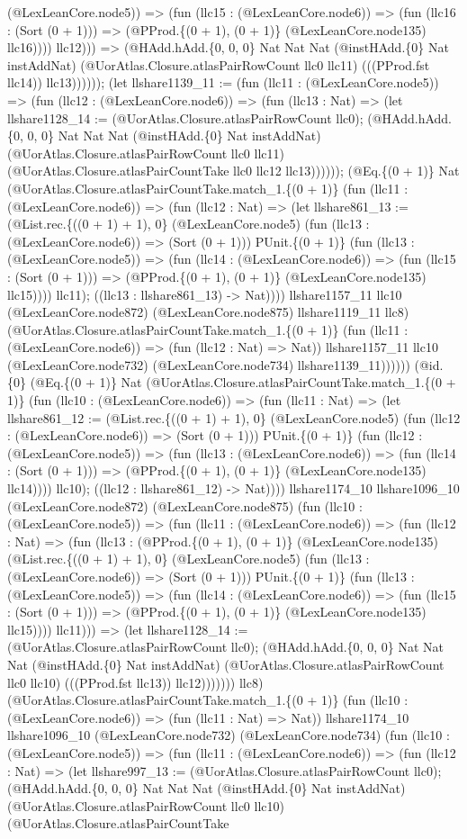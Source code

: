 \documentclass[11pt]{article}
\begin{document}
(@LexLeanCore.node5)) => (fun (llc15 : (@LexLeanCore.node6)) => (fun (llc16 : (Sort (0 + 1))) => (@PProd.\{(0 + 1), (0 + 1)\} (@LexLeanCore.node135) llc16)))) llc12))) => (@HAdd.hAdd.\{0, 0, 0\} Nat Nat Nat (@instHAdd.\{0\} Nat instAddNat) (@UorAtlas.Closure.atlasPairRowCount llc0 llc11) (((PProd.fst llc14)) llc13)))))); (let llshare1139\_11 := (fun (llc11 : (@LexLeanCore.node5)) => (fun (llc12 : (@LexLeanCore.node6)) => (fun (llc13 : Nat) => (let llshare1128\_14 := (@UorAtlas.Closure.atlasPairRowCount llc0); (@HAdd.hAdd.\{0, 0, 0\} Nat Nat Nat (@instHAdd.\{0\} Nat instAddNat) (@UorAtlas.Closure.atlasPairRowCount llc0 llc11) (@UorAtlas.Closure.atlasPairCountTake llc0 llc12 llc13)))))); (@Eq.\{(0 + 1)\} Nat (@UorAtlas.Closure.atlasPairCountTake.match\_1.\{(0 + 1)\} (fun (llc11 : (@LexLeanCore.node6)) => (fun (llc12 : Nat) => (let llshare861\_13 := (@List.rec.\{((0 + 1) + 1), 0\} (@LexLeanCore.node5) (fun (llc13 : (@LexLeanCore.node6)) => (Sort (0 + 1))) PUnit.\{(0 + 1)\} (fun (llc13 : (@LexLeanCore.node5)) => (fun (llc14 : (@LexLeanCore.node6)) => (fun (llc15 : (Sort (0 + 1))) => (@PProd.\{(0 + 1), (0 + 1)\} (@LexLeanCore.node135) llc15)))) llc11); ((llc13 : llshare861\_13) -> Nat)))) llshare1157\_11 llc10 (@LexLeanCore.node872) (@LexLeanCore.node875) llshare1119\_11 llc8) (@UorAtlas.Closure.atlasPairCountTake.match\_1.\{(0 + 1)\} (fun (llc11 : (@LexLeanCore.node6)) => (fun (llc12 : Nat) => Nat)) llshare1157\_11 llc10 (@LexLeanCore.node732) (@LexLeanCore.node734) llshare1139\_11)))))) (@id.\{0\} (@Eq.\{(0 + 1)\} Nat (@UorAtlas.Closure.atlasPairCountTake.match\_1.\{(0 + 1)\} (fun (llc10 : (@LexLeanCore.node6)) => (fun (llc11 : Nat) => (let llshare861\_12 := (@List.rec.\{((0 + 1) + 1), 0\} (@LexLeanCore.node5) (fun (llc12 : (@LexLeanCore.node6)) => (Sort (0 + 1))) PUnit.\{(0 + 1)\} (fun (llc12 : (@LexLeanCore.node5)) => (fun (llc13 : (@LexLeanCore.node6)) => (fun (llc14 : (Sort (0 + 1))) => (@PProd.\{(0 + 1), (0 + 1)\} (@LexLeanCore.node135) llc14)))) llc10); ((llc12 : llshare861\_12) -> Nat)))) llshare1174\_10 llshare1096\_10 (@LexLeanCore.node872) (@LexLeanCore.node875) (fun (llc10 : (@LexLeanCore.node5)) => (fun (llc11 : (@LexLeanCore.node6)) => (fun (llc12 : Nat) => (fun (llc13 : (@PProd.\{(0 + 1), (0 + 1)\} (@LexLeanCore.node135) (@List.rec.\{((0 + 1) + 1), 0\} (@LexLeanCore.node5) (fun (llc13 : (@LexLeanCore.node6)) => (Sort (0 + 1))) PUnit.\{(0 + 1)\} (fun (llc13 : (@LexLeanCore.node5)) => (fun (llc14 : (@LexLeanCore.node6)) => (fun (llc15 : (Sort (0 + 1))) => (@PProd.\{(0 + 1), (0 + 1)\} (@LexLeanCore.node135) llc15)))) llc11))) => (let llshare1128\_14 := (@UorAtlas.Closure.atlasPairRowCount llc0); (@HAdd.hAdd.\{0, 0, 0\} Nat Nat Nat (@instHAdd.\{0\} Nat instAddNat) (@UorAtlas.Closure.atlasPairRowCount llc0 llc10) (((PProd.fst llc13)) llc12))))))) llc8) (@UorAtlas.Closure.atlasPairCountTake.match\_1.\{(0 + 1)\} (fun (llc10 : (@LexLeanCore.node6)) => (fun (llc11 : Nat) => Nat)) llshare1174\_10 llshare1096\_10 (@LexLeanCore.node732) (@LexLeanCore.node734) (fun (llc10 : (@LexLeanCore.node5)) => (fun (llc11 : (@LexLeanCore.node6)) => (fun (llc12 : Nat) => (let llshare997\_13 := (@UorAtlas.Closure.atlasPairRowCount llc0); (@HAdd.hAdd.\{0, 0, 0\} Nat Nat Nat (@instHAdd.\{0\} Nat instAddNat) (@UorAtlas.Closure.atlasPairRowCount llc0 llc10) (@UorAtlas.Closure.atlasPairCountTake 
\end{document}
